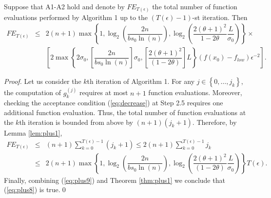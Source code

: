 \begin{corollary}
Suppose that A1-A2 hold and denote by $FE_{T(\epsilon)}$ the total number of function evaluations performed by Algorithm 1 up to the $(T(\epsilon)-1)$-st iteration. Then
\small
\begin{eqnarray}
FE_{T(\epsilon)}&\leq & 2(n+1)\max\left\{1,\log_{2}\left(\dfrac{2n}{b s_{0}\ln(n)}\right),\log_{2}\left(\dfrac{2(\theta+1)^{2}}{1-2\theta}\dfrac{L}{\sigma_{0}}\right)\right\}\times\nonumber\\
& & \left[2\max\left\{2\sigma_{0},\left[\dfrac{2n}{b s_{0}\ln(n)}\right]\sigma_{0},\left[\dfrac{2(\theta+1)^{2}}{(1-2\theta)}\right]L\right\}(f(x_{0})-f_{low})\epsilon^{-2}\right].
\label{eq:plus8}
\end{eqnarray}
\label{cor:plus1}
\end{corollary}
\normalsize

\begin{proof}
Let us consider the $k$th iteration of Algorithm 1. For any $j\in\left\{0,\ldots,j_{k}\right\}$, the computation of $g_{k}^{(j)}$ requires at most $n+1$ function evaluations. Moreover, checking the acceptance condition (\ref{eq:decrease}) at Step 2.5 requires one additional function evaluation. Thus, the total number of function evaluations at the $k$th iteration is bounded from above by $(n+1)(j_{k}+1)$. Therefore, by Lemma \ref{lem:plus1},
\small
\begin{eqnarray}
FE_{T(\epsilon)}&\leq & (n+1)\sum_{k=0}^{T(\epsilon)-1}(j_{k}+1)\leq 2(n+1)\sum_{k=0}^{T(\epsilon)-1}j_{k}\nonumber\\
                &\leq & 2(n+1)\max\left\{1,\log_{2}\left(\dfrac{2n}{bs_{0}\ln(n)}\right),\log_{2}\left(\dfrac{2(\theta+1)^{2}}{(1-2\theta)}\dfrac{L}{\sigma_{0}}\right)\right\}T(\epsilon).
\label{eq:plus9}
\end{eqnarray}
\normalsize
Finally, combining (\ref{eq:plus9}) and Theorem \ref{thm:plus1} we conclude that (\ref{eq:plus8}) is true.\qed
\end{proof}


